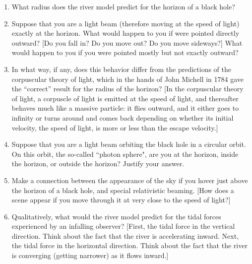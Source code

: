 \documentclass[twocolumn,showpacs,preprintnumbers,amsmath,amssymb,prb]{revtex4}
\begin{document}
\begin{enumerate}

\item[$^\ast$1.]
What radius does the river model predict for the horizon of a black hole?

\item[2.]
Suppose that you are a light beam (therefore moving at the speed of light)
exactly at the horizon.
What would happen to you if were pointed directly outward?
[Do you fall in? Do you move out? Do you move sideways?]
What would happen to you if you were pointed mostly but not exactly outward?

\item[3.]
In what way, if any, does this behavior differ from
the predictions of the corpuscular theory of light,
which in the hands of John Michell in 1784
gave the ``correct'' result for the radius of the horizon?
[In the corpuscular theory of light,
a corpuscle of light is emitted at the speed of light,
and thereafter behaves much like a massive particle:
it flies outward,
and it either goes to infinity
or turns around and comes back
depending on whether its initial velocity,
the speed of light,
is more or less than the escape velocity.]


\item[4.]
Suppose that you are a light beam orbiting the black hole in a circular
orbit.  On this orbit, the so-called ``photon sphere",
are you at the horizon, inside the horizon, or outside the horizon?
Justify your answer.

\item[5.]
Make a connection between the appearance of the sky if you hover
just above the horizon of a black hole, and special relativistic beaming.
[How does a scene appear if you move through it at very close to the
speed of light?]

\item[6.]
Qualitatively, what would the river model predict
for the tidal forces experienced by an infalling observer?
[First, the tidal force in the vertical direction.
Think about the fact that the river is accelerating inward.
Next, the tidal force in the horizontal direction.
Think about the fact that the river is converging (getting narrower)
as it flows inward.]


\end{enumerate}
\end{document}
